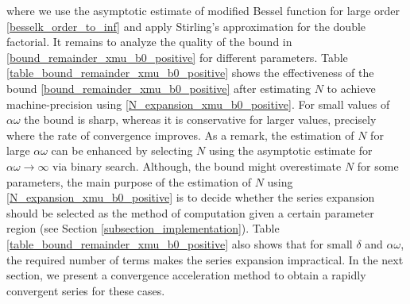 \documentclass[10pt,a4paper,oneside]{article}
\numberwithin{equation}{section}
\begin{document}
where we use the asymptotic estimate of modified Bessel function for large order \eqref{besselk_order_to_inf} and apply Stirling's approximation for the double factorial. It remains to analyze the quality of the bound in \eqref{bound_remainder_xmu_b0_positive} for different parameters. Table \ref{table_bound_remainder_xmu_b0_positive} shows the effectiveness of the bound \eqref{bound_remainder_xmu_b0_positive} after estimating $N$ to achieve machine-precision using \eqref{N_expansion_xmu_b0_positive}. For small values of $\alpha\omega$ the bound is sharp, whereas it is conservative for larger values, precisely where the rate of convergence improves. As a remark, the estimation of $N$ for large $\alpha\omega$ can be enhanced by selecting $N$ using the asymptotic estimate for $\alpha\omega \to \infty$ via binary search. Although, the bound might overestimate $N$ for some parameters, the main purpose of the estimation of $N$ using \eqref{N_expansion_xmu_b0_positive} is to decide whether the series expansion should be selected as the method of computation given a certain parameter region (see Section \ref{subsection_implementation}). Table \ref{table_bound_remainder_xmu_b0_positive} also shows that for small $\delta$ and $\alpha\omega$, the required number of terms makes the series expansion impractical. In the next section, we present a convergence acceleration method to obtain a rapidly convergent series for these cases.

\begin{table}[H]
	\centering
	\caption{The remainder of the series expansion  \eqref{expansion_xmu_b0_positive} and bound \eqref{bound_remainder_xmu_b0_positive}, estimating $N$ using \eqref{N_expansion_xmu_b0_positive} to achieve machine precision.}
	\label{table_bound_remainder_xmu_b0_positive}
\end{table}
\end{document}
